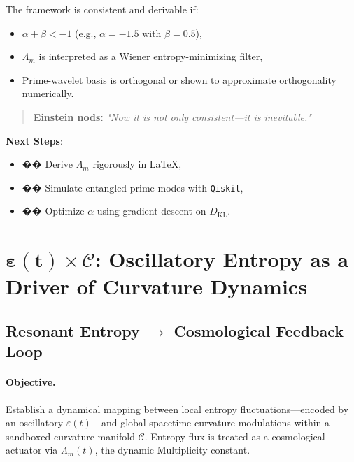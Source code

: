 \documentclass[12pt]{article}
\theoremstyle{plain}
\begin{document}
The framework is consistent and derivable if:
\begin{itemize}
    \item \(\alpha + \beta < -1\) (e.g., \(\alpha = -1.5\) with \(\beta = 0.5\)),
    \item \(\Lambda_m\) is interpreted as a Wiener entropy-minimizing filter,
    \item Prime-wavelet basis is orthogonal or shown to approximate orthogonality numerically.
\end{itemize}

\begin{quote}
\textbf{Einstein nods:} \textit{"Now it is not only consistent—it is inevitable."}
\end{quote}

\noindent\textbf{Next Steps}:
\begin{itemize}
    \item �� Derive \(\Lambda_m\) rigorously in LaTeX,
    \item �� Simulate entangled prime modes with \texttt{Qiskit},
    \item �� Optimize \(\alpha\) using gradient descent on \(D_{\mathrm{KL}}\).
\end{itemize}

\section{$\boldsymbol{\varepsilon(t)} \times \mathcal{C}$: Oscillatory Entropy as a Driver of Curvature Dynamics}

\subsection*{Resonant Entropy $\rightarrow$ Cosmological Feedback Loop}

\paragraph{Objective.}
Establish a dynamical mapping between local entropy fluctuations—encoded by an oscillatory $\varepsilon(t)$—and global spacetime curvature modulations within a sandboxed curvature manifold $\mathcal{C}$. Entropy flux is treated as a cosmological actuator via $\Lambda_m(t)$, the dynamic Multiplicity constant.
\end{document}
